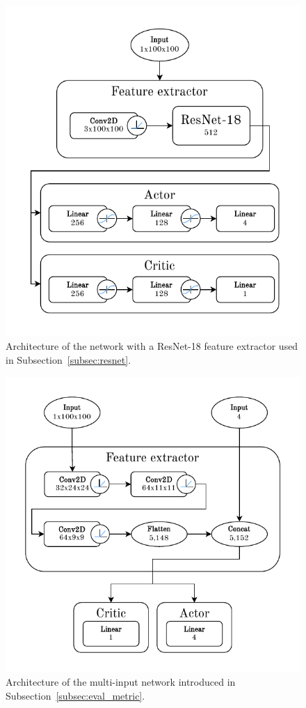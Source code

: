\documentclass[
  digital,     %
  oneside,     %
  nosansbold,  %
  nocolorbold, %
  lof,         %
  lot,         %
]{fithesis4}
\begin{document}
\begin{figure}
    \includegraphics[width=1\linewidth]{diagrams/resnet_arch.pdf}
    \caption{Architecture of the network with a ResNet-18 feature extractor used in Subsection~\ref{subsec:resnet}.}
    \label{fig:resnet_arch}
\end{figure}

\begin{figure}
    \includegraphics[width=1\linewidth]{diagrams/combined_policy.pdf}
    \caption{Architecture of the multi-input network introduced in Subsection~\ref{subsec:eval_metric}.}
    \label{fig:multiinput_arch}
\end{figure}
\end{document}
